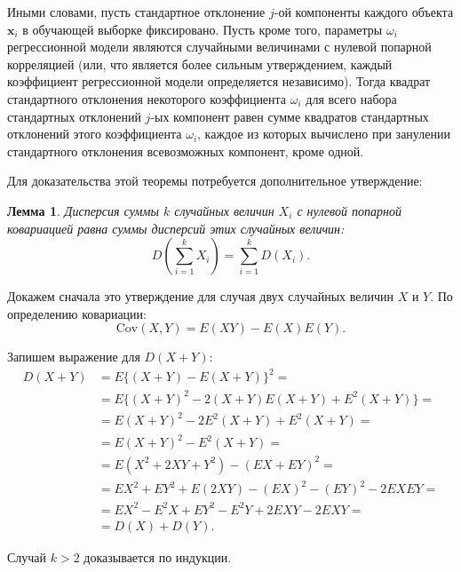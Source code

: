 \documentclass[12pt,a4paper]{article}
\newtheorem{lemm}{Лемма}
\begin{document}
Иными словами, пусть стандартное отклонение $j$-ой компоненты каждого
объекта $\mathbf{x}_i$ в обучающей выборке фиксировано. Пусть кроме того,
параметры $\omega_i$ регрессионной модели являются случайными величинами
с нулевой попарной корреляцией (или, что является более сильным утверждением,
каждый коэффициент регрессионной модели определяется независимо). Тогда квадрат
стандартного отклонения некоторого коэффициента $\omega_i$ для всего
набора стандартных отклонений $j$-ых компонент равен сумме квадратов
стандартных отклонений этого коэффициента $\omega_i$, каждое из которых
вычислено при занулении стандартного отклонения всевозможных компонент,
кроме одной.

Для доказательства этой теоремы потребуется дополнительное утверждение:
\begin{lemm}
  Дисперсия суммы $k$ случайных величин $X_i$ с нулевой попарной ковариацией равна
  суммы дисперсий этих случайных величин:
  \[
    D(\sum_{i=1}^k X_i) = \sum_{i=1}^k D(X_i).
  \]
\end{lemm}
\begin{Proof}
  Докажем сначала это утверждение для случая двух случайных величин $X$
  и $Y$.
  По определению ковариации:
  \[
    \text{Cov}(X, Y) = E(X Y) - E(X) E(Y).
  \]
  
  Запишем выражение для $D(X + Y)$:
  \begin{align*}
    D(X+Y) &= E\{ (X + Y) - E(X + Y) \}^2 = \\
           &= E\{ (X + Y)^2 - 2 (X + Y) E (X + Y) + E^2 (X + Y) \} = \\
           &= E (X + Y)^2 - 2 E^2 (X + Y) + E^2 (X + Y) = \\
           &= E (X + Y)^2 - E^2 (X + Y) = \\
           &= E (X^2 + 2XY + Y^2) - (EX + EY)^2 = \\
           &= E X^2 + E Y^2 + E (2XY) - (EX)^2 - (EY)^2 - 2 EX EY = \\
           &= E X^2 - E^2 X + E Y^2 - E^2 Y + 2 EXY - 2 EXY = \\
           &= D(X) + D(Y).
  \end{align*}
  
  Случай $k > 2$ доказывается по индукции.
\end{Proof}
\end{document}
